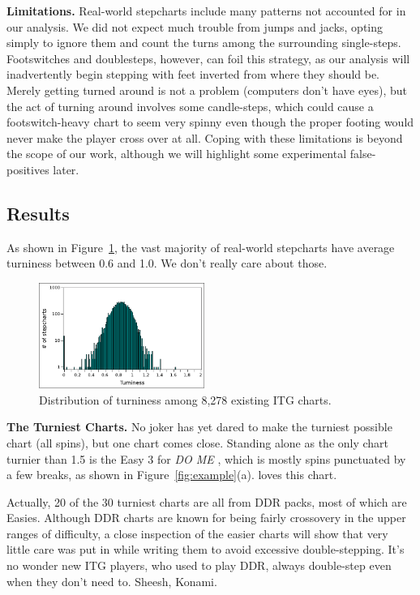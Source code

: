 \documentclass[10pt]{sigplanconf}
\begin{document}
{\bf Limitations.}
Real-world stepcharts include many patterns not accounted for in our analysis. We did not expect much trouble from jumps and jacks, opting simply to ignore them and count the turns among the surrounding single-steps.
Footswitches and doublesteps, however, can foil this strategy, as our analysis will inadvertently begin stepping with feet inverted from where they should be.
Merely getting turned around is not a problem (computers don't have eyes), but the act of turning around involves some candle-steps, which could cause a footswitch-heavy chart to seem very spinny even though the proper footing would never make the player cross over at all.
Coping with these limitations is beyond the scope of our work, although we will highlight some experimental false-positives later.

\subsection{Results}

As shown in Figure~\ref{fig:distribution}, the vast majority of real-world stepcharts have average turniness between 0.6 and 1.0.
We don't really care about those.

\begin{figure}[t]
	\begin{center}
	\includegraphics[width=0.48\textwidth]{realworld.pdf}
	\end{center}
	\caption{Distribution of turniness among 8,278 existing ITG charts.}
	\label{fig:distribution}
\end{figure}

{\bf The Turniest Charts.}
No joker has yet dared to make the turniest possible chart (all spins), but one chart comes close.
Standing alone as the only chart turnier than 1.5 is the Easy 3 for {\em DO ME} \cite{dome}, which is mostly spins punctuated by a few breaks, as shown in Figure~\ref{fig:example}(a).
\cite{alanv} loves this chart.

Actually, 20 of the 30 turniest charts are all from DDR packs, most of which are Easies. Although DDR charts are known for being fairly crossovery in the upper ranges of difficulty, a close inspection of the easier charts will show that very little care was put in while writing them to avoid excessive double-stepping.
It's no wonder new ITG players, who used to play DDR, always double-step even when they don't need to. Sheesh, Konami.
\end{document}

